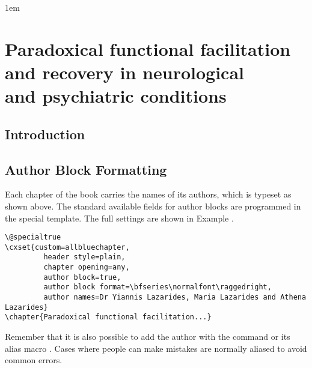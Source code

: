 \@specialtrue
{}
\renewsubsection\renewsection
\parindent1em
\chapter[Paradoxical facilitation]{Paradoxical functional facilitation\\ and recovery in neurological\\
 and psychiatric conditions}

\section{Introduction}
\lorem

\section{Author Block Formatting}

Each chapter of the book carries the names of its authors, which is typeset as shown above. The standard available fields for author blocks are programmed in the special template. The full settings are shown in Example .
\medskip

\noindent\begin{tcolorbox}
\begin{lstlisting}
\@specialtrue
\cxset{custom=allbluechapter,
         header style=plain, 
         chapter opening=any,
         author block=true,
         author block format=\bfseries\normalfont\raggedright,
         author names=Dr Yiannis Lazarides, Maria Lazarides and Athena Lazarides}
\chapter{Paradoxical functional facilitation...}
\end{lstlisting}
\end{tcolorbox}

Remember that it is also possible to add the author with the command  or its alias macro . Cases where people can make mistakes are normally aliased to avoid common errors.

